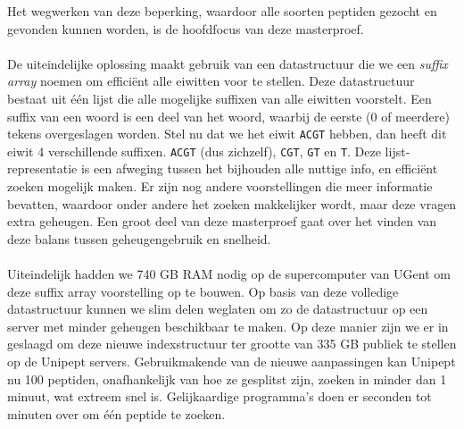 Het wegwerken van deze beperking, waardoor alle soorten peptiden gezocht en gevonden kunnen worden, is de hoofdfocus van deze masterproef.
\\ \\
De uiteindelijke oplossing maakt gebruik van een datastructuur die we een \textit{suffix array} noemen om efficiënt alle eiwitten voor te stellen.
Deze datastructuur bestaat uit één lijst die alle mogelijke suffixen van alle eiwitten voorstelt.
Een suffix van een woord is een deel van het woord, waarbij de eerste (0 of meerdere) tekens overgeslagen worden.
Stel nu dat we het eiwit \texttt{ACGT} hebben, dan heeft dit eiwit 4 verschillende suffixen.
\texttt{ACGT} (dus zichzelf), \texttt{CGT}, \texttt{GT} en \texttt{T}.
Deze lijst-representatie is een afweging tussen het bijhouden alle nuttige info, en efficiënt zoeken mogelijk maken.
Er zijn nog andere voorstellingen die meer informatie bevatten, waardoor onder andere het zoeken makkelijker wordt, maar deze vragen extra geheugen.
Een groot deel van deze masterproef gaat over het vinden van deze balans tussen geheugengebruik en snelheid.
\\ \\
Uiteindelijk hadden we 740 GB RAM nodig op de supercomputer van UGent om deze suffix array voorstelling op te bouwen.
Op basis van deze volledige datastructuur kunnen we slim delen weglaten om zo de datastructuur op een server met minder geheugen beschikbaar te maken.
Op deze manier zijn we er in geslaagd om deze nieuwe indexstructuur ter grootte van 335 GB publiek te stellen op de Unipept servers.
Gebruikmakende van de nieuwe aanpassingen kan Unipept nu 100 peptiden, onafhankelijk van hoe ze gesplitst zijn, zoeken in minder dan 1 minuut, wat extreem snel is.
Gelijkaardige programma's doen er seconden tot minuten over om één peptide te zoeken.
